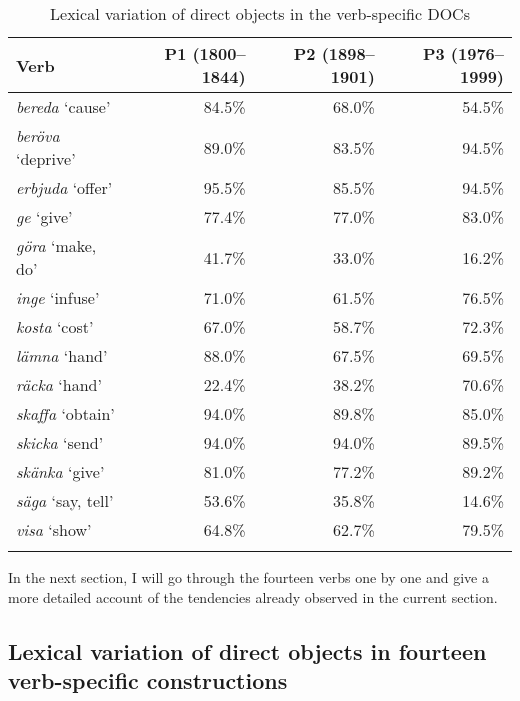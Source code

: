 \documentclass[output=paper]{langscibook}
\begin{document}
\begin{table}
\caption{Lexical variation of direct objects in the verb-specific DOCs}
\label{tab:valdeson:7}
\begin{tabularx}{.9\textwidth}{lrrr}
\lsptoprule
Verb & P1 (1800–1844) & P2 (1898–1901) & P3 (1976–1999)\\
\midrule
\textit{bereda} ‘cause’ & 84.5\% & 68.0\% & 54.5\%\\
\textit{beröva} ‘deprive’ & 89.0\% & 83.5\% & 94.5\%\\
\textit{erbjuda} ‘offer’ & 95.5\% & 85.5\% & 94.5\%\\
\textit{ge} ‘give’ & 77.4\% & 77.0\% & 83.0\%\\
\textit{göra} ‘make, do’ & 41.7\% & 33.0\% & 16.2\%\\
\textit{inge} ‘infuse’ & 71.0\% & 61.5\% & 76.5\%\\
\textit{kosta} ‘cost’ & 67.0\% & 58.7\% & 72.3\%\\
\textit{lämna} ‘hand’ & 88.0\% & 67.5\% & 69.5\%\\
\textit{räcka} ‘hand’ & 22.4\% & 38.2\% & 70.6\%\\
\textit{skaffa} ‘obtain’ & 94.0\% & 89.8\% & 85.0\%\\
\textit{skicka} ‘send’ & 94.0\% & 94.0\% & 89.5\%\\
\textit{skänka} ‘give’ & 81.0\% & 77.2\% & 89.2\%\\
\textit{säga} ‘say, tell’ & 53.6\% & 35.8\% & 14.6\%\\
\textit{visa} ‘show’ & 64.8\% & 62.7\% & 79.5\%\\
\lspbottomrule
\end{tabularx}
\end{table}

In the next section, I will go through the fourteen verbs one by one and give a more detailed account of the tendencies already observed in the current section.


\subsection{Lexical variation of direct objects in fourteen verb-specific constructions}\label{sec:valdeson:5.3}
\end{document}
